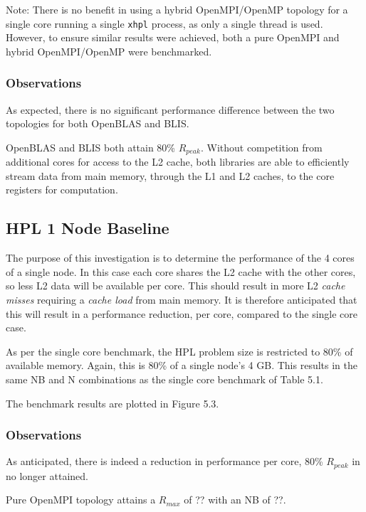 Note: There is no benefit in using a hybrid OpenMPI/OpenMP topology for a single core running a single \verb|xhpl| process, as only a single thread is used. However, to ensure similar results were achieved, both a pure OpenMPI and hybrid OpenMPI/OpenMP were benchmarked.

%
%
\subsubsection{Observations}

As expected, there is no significant performance difference between the two topologies for both OpenBLAS and BLIS.

OpenBLAS and BLIS both attain 80\% $R_{peak}$. Without competition from additional cores for access to the L2 cache, both libraries are able to efficiently stream data from main memory, through the L1 and L2 caches, to the core registers for computation. 


%
%
\subsection{HPL 1 Node Baseline}

The purpose of this investigation is to determine the performance of the 4 cores of a single node. In this case each core shares the L2 cache with the other cores, so less L2 data will be available per core. This should result in more L2 \emph{cache misses} requiring a \emph{cache load} from main memory. It is therefore anticipated that this will result in a performance reduction, per core, compared to the single core case.

As per the single core benchmark, the HPL problem size is restricted to 80\% of available memory. Again, this is 80\% of a single node's 4 GB. This results in the same NB and N combinations as the single core benchmark of Table 5.1.

The benchmark results are plotted in Figure 5.3. 

%
%
\subsubsection{Observations}

As anticipated, there is indeed a reduction in performance per core, 80\% $R_{peak}$ in no longer attained.

Pure OpenMPI topology attains a $R_{max}$ of ?? with an NB of ??.

